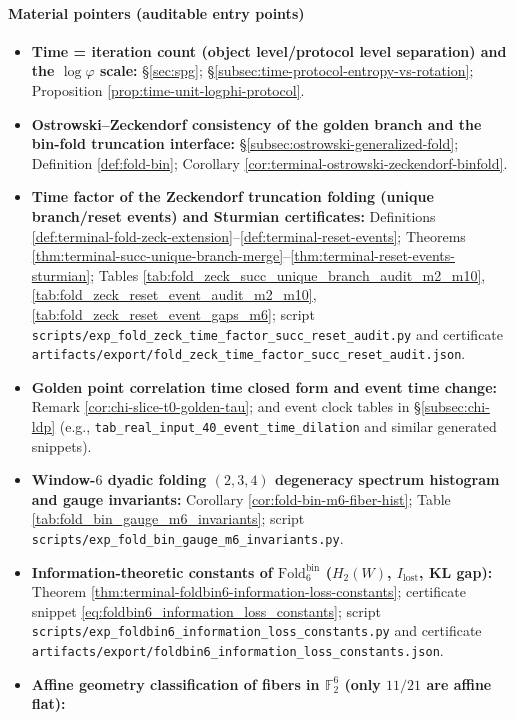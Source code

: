 \paragraph{Material pointers (auditable entry points)}
\begin{itemize}
  \item \textbf{Time = iteration count (object level/protocol level separation) and the \(\log\varphi\) scale:}
  \S\ref{sec:spg}; \S\ref{subsec:time-protocol-entropy-vs-rotation}; Proposition \ref{prop:time-unit-logphi-protocol}.
  \item \textbf{Ostrowski--Zeckendorf consistency of the golden branch and the bin-fold truncation interface:}
  \S\ref{subsec:ostrowski-generalized-fold}; Definition \ref{def:fold-bin}; Corollary \ref{cor:terminal-ostrowski-zeckendorf-binfold}.
  \item \textbf{Time factor of the Zeckendorf truncation folding (unique branch/reset events) and Sturmian certificates:}
  Definitions \ref{def:terminal-fold-zeck-extension}--\ref{def:terminal-reset-events}; Theorems \ref{thm:terminal-succ-unique-branch-merge}--\ref{thm:terminal-reset-events-sturmian};
  Tables \ref{tab:fold_zeck_succ_unique_branch_audit_m2_m10}, \ref{tab:fold_zeck_reset_event_audit_m2_m10}, \ref{tab:fold_zeck_reset_event_gaps_m6};
  script \texttt{scripts/exp\_fold\_zeck\_time\_factor\_succ\_reset\_audit.py} and certificate \texttt{artifacts/export/fold\_zeck\_time\_factor\_succ\_reset\_audit.json}.
  \item \textbf{Golden point correlation time closed form and event time change:}
  Remark \ref{cor:chi-slice-t0-golden-tau}; and event clock tables in \S\ref{subsec:chi-ldp} (e.g., \texttt{tab\_real\_input\_40\_event\_time\_dilation} and similar generated snippets).
  \item \textbf{Window-\(6\) dyadic folding \((2,3,4)\) degeneracy spectrum histogram and gauge invariants:}
  Corollary \ref{cor:fold-bin-m6-fiber-hist}; Table \ref{tab:fold_bin_gauge_m6_invariants}; script \texttt{scripts/exp\_fold\_bin\_gauge\_m6\_invariants.py}.
  \item \textbf{Information-theoretic constants of \(\mathrm{Fold}^{\mathrm{bin}}_6\) (\(H_2(W)\), \(I_{\mathrm{lost}}\), KL gap):}
  Theorem \ref{thm:terminal-foldbin6-information-loss-constants};
  certificate snippet \eqref{eq:foldbin6_information_loss_constants};
  script \texttt{scripts/exp\_foldbin6\_information\_loss\_constants.py} and certificate \texttt{artifacts/export/foldbin6\_information\_loss\_constants.json}.
  \item \textbf{Affine geometry classification of fibers in \(\mathbb{F}_2^6\) (only \(11/21\) are affine flat):}

\end{itemize}
